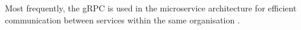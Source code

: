 Most frequently, the gRPC is used in the microservice architecture for efficient communication between services within the same organisation \cite{DesignDataIntensiveApplications}.











